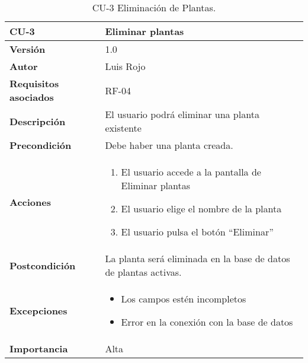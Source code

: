 \begin{table}[p]
	\centering
	\begin{tabularx}{\linewidth}{ p{} p{} }
		\toprule
		\textbf{CU-3}    & \textbf{Eliminar plantas}\\
		\toprule
		\textbf{Versión}              & 1.0    \\
		\textbf{Autor}                & Luis Rojo \\
		\textbf{Requisitos asociados} & RF-04 \\
		\textbf{Descripción}          & El usuario podrá eliminar una planta existente \\
		\textbf{Precondición}         &  Debe haber una planta creada. \\
		\textbf{Acciones}             &
		\begin{enumerate}
			\def\labelenumi{\arabic{enumi}.}
			\tightlist
			\item El usuario accede a la pantalla de Eliminar plantas
			\item El usuario elige el nombre de la planta
                \item El usuario pulsa el botón ``Eliminar''
		\end{enumerate}\\
		\textbf{Postcondición}        & La planta será eliminada en la base de datos de plantas activas. \\
		\textbf{Excepciones}          & 
            \begin{itemize}
                \item Los campos estén incompletos
                \item Error en la conexión con la base de datos
            \end{itemize}\\
		\textbf{Importancia}          & Alta  \\
		\bottomrule
	\end{tabularx}
	\caption{CU-3 Eliminación de Plantas.}
\end{table}

